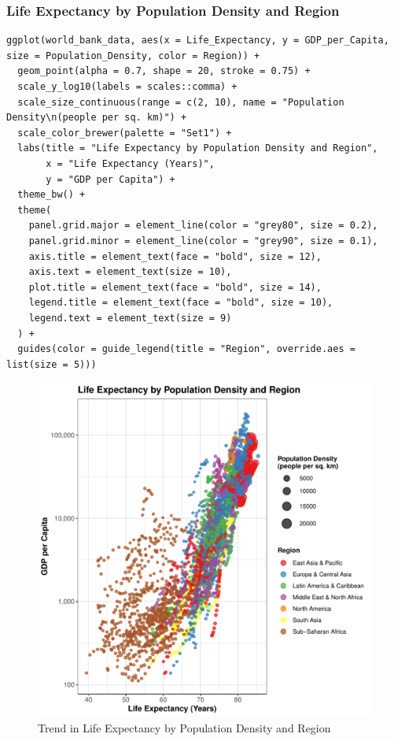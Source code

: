 \documentclass{article}\usepackage[]{graphicx}\usepackage[]{xcolor}
\makeatletter
\def\maxwidth{ %
  \ifdim\Gin@nat@width>\linewidth
    \linewidth
  \else
    \Gin@nat@width
  \fi
}
\newenvironment{knitrout}{}{} %
\makeatother
\begin{document}
\subsubsection{Life Expectancy by Population Density and Region}
\begin{lstlisting}
ggplot(world_bank_data, aes(x = Life_Expectancy, y = GDP_per_Capita, size = Population_Density, color = Region)) +
  geom_point(alpha = 0.7, shape = 20, stroke = 0.75) +  
  scale_y_log10(labels = scales::comma) + 
  scale_size_continuous(range = c(2, 10), name = "Population Density\n(people per sq. km)") +  
  scale_color_brewer(palette = "Set1") +  
  labs(title = "Life Expectancy by Population Density and Region",  
       x = "Life Expectancy (Years)",
       y = "GDP per Capita") + 
  theme_bw() +  
  theme(
    panel.grid.major = element_line(color = "grey80", size = 0.2),
    panel.grid.minor = element_line(color = "grey90", size = 0.1),
    axis.title = element_text(face = "bold", size = 12),
    axis.text = element_text(size = 10),
    plot.title = element_text(face = "bold", size = 14),
    legend.title = element_text(face = "bold", size = 10),
    legend.text = element_text(size = 9)
  ) +
  guides(color = guide_legend(title = "Region", override.aes = list(size = 5)))  
\end{lstlisting}
\newpage
\begin{figure}[h!]
\centering
\begin{knitrout}
\color{fgcolor}
\includegraphics[width=\maxwidth]{figure/unnamed-chunk-8-1} 
\end{knitrout}
\caption{Trend in Life Expectancy by Population Density and Region}
\label{fig}
\end{figure}
\end{document}
